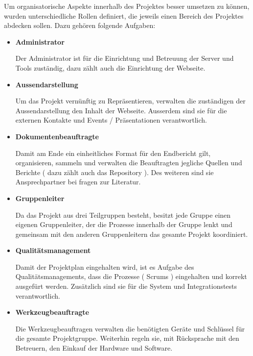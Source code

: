 Um organisatorische Aspekte innerhalb des Projektes besser umsetzen zu k\"onnen, wurden unterschiedliche Rollen definiert, die jeweils einen Bereich des Projektes abdecken sollen. Dazu geh\"oren folgende Aufgaben:

\begin{itemize}
\item\textbf{Administrator}

Der Administrator ist f\"ur die Einrichtung und Betreuung der Server und Tools zust\"andig, dazu z\"ahlt auch die Einrichtung der Webseite.

\item \textbf{Aussendarstellung}

Um das Projekt vern\"unftig zu Repr\"asentieren, verwalten die zust\"andigen der Aussendarstellung den Inhalt der Webseite. Ausserdem sind sie f\"ur die externen Kontakte und Events / Pr\"asentationen verantwortlich.

\item \textbf{Dokumentenbeauftragte}

Damit am Ende ein einheitliches Format f\"ur den Endbericht gilt, organisieren, sammeln und verwalten die Beauftragten jegliche Quellen und Berichte ( dazu z\"ahlt auch das Repository ). Des weiteren sind sie Ansprechpartner bei fragen zur Literatur.

\item \textbf{Gruppenleiter}

Da das Projekt aus drei Teilgruppen besteht, besitzt jede Gruppe einen eigenen Gruppenleiter, der die Prozesse innerhalb der Gruppe lenkt und gemeinsam mit den anderen Gruppenleitern das gesamte Projekt koordiniert.

\item \textbf{Qualit\"atsmanagement}

Damit der Projektplan eingehalten wird, ist es Aufgabe des Qualit\"atsmanagements, dass die Prozesse ( Scrums ) eingehalten und korrekt ausgef\"urt werden. Zus\"atzlich sind sie f\"ur die System und Integrationstests verantwortlich.

\item \textbf{Werkzeugbeauftragte}

Die Werkzeugbeauftragen verwalten die ben\"otigten Ger\"ate und Schl\"ussel f\"ur die gesamte Projektgruppe. Weiterhin regeln sie, mit R\"ucksprache mit den Betreuern, den Einkauf der Hardware und Software.

\end{itemize}


